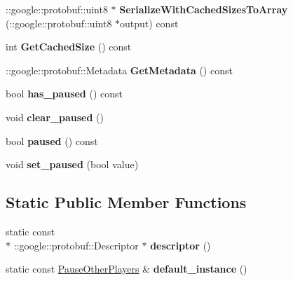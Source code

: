 \begin{DoxyCompactItemize}
\item 
\hypertarget{class_pause_other_players_a946433ba2849ab63b3f6824bbcdd0280}{\-::google\-::protobuf\-::uint8 $\ast$ {\bfseries Serialize\-With\-Cached\-Sizes\-To\-Array} (\-::google\-::protobuf\-::uint8 $\ast$output) const }\label{class_pause_other_players_a946433ba2849ab63b3f6824bbcdd0280}

\item 
\hypertarget{class_pause_other_players_ac74be5a0f00009b5a21590c2e8c83987}{int {\bfseries Get\-Cached\-Size} () const }\label{class_pause_other_players_ac74be5a0f00009b5a21590c2e8c83987}

\item 
\hypertarget{class_pause_other_players_afbca7aa83badf6f3c59be35869d1b75c}{\-::google\-::protobuf\-::\-Metadata {\bfseries Get\-Metadata} () const }\label{class_pause_other_players_afbca7aa83badf6f3c59be35869d1b75c}

\item 
\hypertarget{class_pause_other_players_aafa7dd371c5b5f3810138683a93f7ed6}{bool {\bfseries has\-\_\-paused} () const }\label{class_pause_other_players_aafa7dd371c5b5f3810138683a93f7ed6}

\item 
\hypertarget{class_pause_other_players_ac15c76196cd209d557c60f2d41f4602d}{void {\bfseries clear\-\_\-paused} ()}\label{class_pause_other_players_ac15c76196cd209d557c60f2d41f4602d}

\item 
\hypertarget{class_pause_other_players_a519e1195e02787240129e18ba893faaa}{bool {\bfseries paused} () const }\label{class_pause_other_players_a519e1195e02787240129e18ba893faaa}

\item 
\hypertarget{class_pause_other_players_ac6c380bdd56e7959a3d01ef49aacd0cc}{void {\bfseries set\-\_\-paused} (bool value)}\label{class_pause_other_players_ac6c380bdd56e7959a3d01ef49aacd0cc}

\end{DoxyCompactItemize}
\subsection*{Static Public Member Functions}
\begin{DoxyCompactItemize}
\item 
\hypertarget{class_pause_other_players_a54176046797703d917a3f244fe65bc2b}{static const \\*
\-::google\-::protobuf\-::\-Descriptor $\ast$ {\bfseries descriptor} ()}\label{class_pause_other_players_a54176046797703d917a3f244fe65bc2b}

\item 
\hypertarget{class_pause_other_players_aa7aee4f6cedf2aded36cbc684a4040c6}{static const \hyperlink{class_pause_other_players}{Pause\-Other\-Players} \& {\bfseries default\-\_\-instance} ()}\label{class_pause_other_players_aa7aee4f6cedf2aded36cbc684a4040c6}

\end{DoxyCompactItemize}
